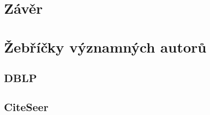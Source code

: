 \documentclass[12pt,titlepage]{report}
\begin{document}
\chapter{Závěr}




\newpage
\appendix
\chapter{Žebříčky významných autorů}
\label{chapter:zebricky}

\newpage
\section{DBLP}







% 




\section{CiteSeer}







% 



\end{document}
